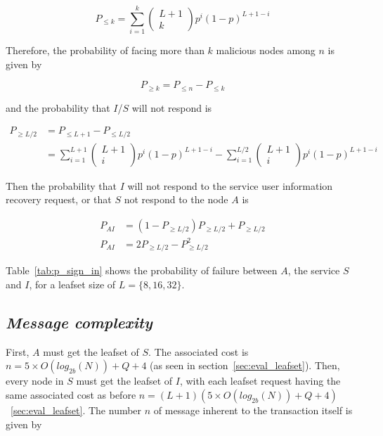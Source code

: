     \begin{equation}
      P_{\leq k} = \sum_{i=1}^{k} \begin{pmatrix} L+1 \\ k\end{pmatrix} p^i (1-p)^{L+1-i}
    \end{equation}

    Therefore, the probability of facing more than $k$ malicious nodes among
$n$ is given by

    \begin{equation}
      P_{\ge k} = P_{\leq n} - P_{\leq k}
    \end{equation}

    and the probability that $I$/$S$ will not respond is

    \begin{align}
      P_{\ge L/2} &= P_{\leq L+1} - P_{\leq L/2} \\
      &= \sum_{i=1}^{L+1} \begin{pmatrix} L+1 \\ i\end{pmatrix} p^i (1-p)^{L+1-i}
      - \sum_{i=1}^{L/2} \begin{pmatrix} L+1 \\ i\end{pmatrix} p^i (1-p)^{L+1-i}
    \end{align}


    Then the probability that $I$ will not respond to the service user
information recovery request, or that $S$ not respond to the node $A$ is

    \begin{align}
      P_{AI} &= (1- P_{\ge L/2}) P_{\ge L/2} +  P_{\ge L/2} \\
      P_{AI} &= 2P_{\ge L/2} - P^2_{\ge L/2}
    \end{align}


    Table~\eqref{tab:p_sign_in} shows the probability of failure
between $A$, the service $S$ and $I$, for a leafset size of $L = \{8,16,32\}$.

  \subsection{\textit{Message complexity}}
    First, $A$ must get the leafset of $S$. The associated cost is $n = 5
\times O(log_{2b}(N)) + Q + 4$ (as seen in section~\ref{sec:eval_leafset}).
Then, every node in $S$ must get the leafset of $I$, with each leafset request
having the same associated cost as before $n = (L+1)(5 \times O(log_{2b}(N)) + Q + 4)$~\ref{sec:eval_leafset}.
    The number $n$ of message inherent to the transaction itself is given by

